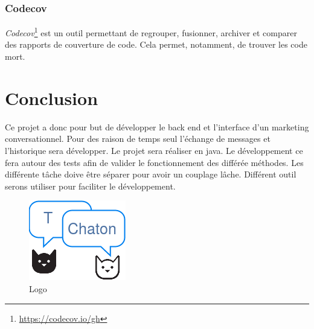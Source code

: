 \documentclass[12pt]{article}
\begin{document}
\subsubsection{Codecov}
\textit{Codecov}\footnote{\url{https://codecov.io/gh}} est un outil permettant de regrouper, fusionner, archiver et comparer des rapports de couverture de code. Cela permet, notamment, de trouver les code mort.


\section{Conclusion}
Ce projet a donc pour but de développer le back end et l'interface d'un marketing conversationnel. Pour des raison de temps seul l'échange de messages et l'historique sera développer. Le projet sera réaliser en java. Le développement ce fera autour des tests afin de valider le fonctionnement des différée méthodes. Les différente tâche doive être séparer pour avoir un couplage lâche. Différent outil serons utiliser pour faciliter le développement.

\begin{figure}[h]
    \centering
    \includegraphics[]{img/logo.png}
    \caption{Logo}
\end{figure}



\end{document}
